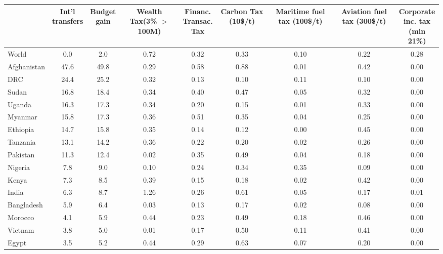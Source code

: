
\begin{tabular}[t]{lcccccccc}
\toprule
  & \makecell{Int'l\\transfers} & \makecell{Budget\\gain} & \makecell{Wealth\\Tax(3\%\\$>$100M)} & \makecell{Financ.\\Transac.\\Tax} & \makecell{Carbon\\Tax\\(10\$/t)} & \makecell{Maritime\\fuel tax\\(100\$/t)} & \makecell{Aviation\\fuel tax\\(300\$/t)} & \makecell{Corporate\\inc. tax\\(min 21\%)}\\
\midrule
World & 0.0 & 2.0 & 0.72 & 0.32 & 0.33 & 0.10 & 0.22 & 0.28\\
Afghanistan & 47.6 & 49.8 & 0.29 & 0.58 & 0.88 & 0.01 & 0.42 & 0.00\\
DRC & 24.4 & 25.2 & 0.32 & 0.13 & 0.10 & 0.11 & 0.10 & 0.00\\
Sudan & 16.8 & 18.4 & 0.34 & 0.40 & 0.47 & 0.05 & 0.32 & 0.00\\
Uganda & 16.3 & 17.3 & 0.34 & 0.20 & 0.15 & 0.01 & 0.33 & 0.00\\
Myanmar & 15.8 & 17.3 & 0.36 & 0.51 & 0.35 & 0.04 & 0.25 & 0.00\\
Ethiopia & 14.7 & 15.8 & 0.35 & 0.14 & 0.12 & 0.00 & 0.45 & 0.00\\
Tanzania & 13.1 & 14.2 & 0.36 & 0.22 & 0.20 & 0.02 & 0.26 & 0.00\\
Pakistan & 11.3 & 12.4 & 0.02 & 0.35 & 0.49 & 0.04 & 0.18 & 0.00\\
Nigeria & 7.8 & 9.0 & 0.10 & 0.24 & 0.34 & 0.35 & 0.09 & 0.00\\
Kenya & 7.3 & 8.5 & 0.39 & 0.15 & 0.18 & 0.02 & 0.42 & 0.00\\
India & 6.3 & 8.7 & 1.26 & 0.26 & 0.61 & 0.05 & 0.17 & 0.01\\
Bangladesh & 5.9 & 6.4 & 0.03 & 0.13 & 0.17 & 0.02 & 0.08 & 0.00\\
Morocco & 4.1 & 5.9 & 0.44 & 0.23 & 0.49 & 0.18 & 0.46 & 0.00\\
Vietnam & 3.8 & 5.0 & 0.01 & 0.17 & 0.50 & 0.11 & 0.41 & 0.00\\
Egypt & 3.5 & 5.2 & 0.44 & 0.29 & 0.63 & 0.07 & 0.20 & 0.00\\

\end{tabular}
